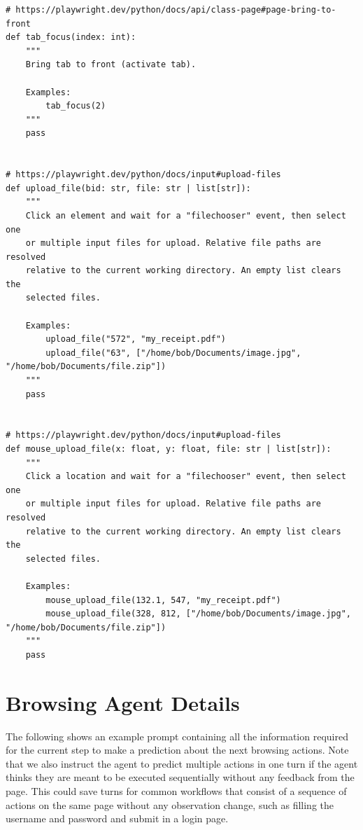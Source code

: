 \begin{verbatim}
# https://playwright.dev/python/docs/api/class-page#page-bring-to-front
def tab_focus(index: int):
    """
    Bring tab to front (activate tab).

    Examples:
        tab_focus(2)
    """
    pass


# https://playwright.dev/python/docs/input#upload-files
def upload_file(bid: str, file: str | list[str]):
    """
    Click an element and wait for a "filechooser" event, then select one
    or multiple input files for upload. Relative file paths are resolved
    relative to the current working directory. An empty list clears the
    selected files.

    Examples:
        upload_file("572", "my_receipt.pdf")
        upload_file("63", ["/home/bob/Documents/image.jpg", "/home/bob/Documents/file.zip"])
    """
    pass


# https://playwright.dev/python/docs/input#upload-files
def mouse_upload_file(x: float, y: float, file: str | list[str]):
    """
    Click a location and wait for a "filechooser" event, then select one
    or multiple input files for upload. Relative file paths are resolved
    relative to the current working directory. An empty list clears the
    selected files.

    Examples:
        mouse_upload_file(132.1, 547, "my_receipt.pdf")
        mouse_upload_file(328, 812, ["/home/bob/Documents/image.jpg", "/home/bob/Documents/file.zip"])
    """
    pass

\end{verbatim}

\section{Browsing Agent Details}
\label{sec:browsing-agent-details}

The following shows an example prompt containing all the information required for the current step to make a prediction about the next browsing actions.
Note that we also instruct the agent to predict multiple actions in one turn if the agent thinks they are meant to be executed sequentially without any feedback from the page.
This could save turns for common workflows that consist of a sequence of actions on the same page without any observation change, such as filling the username and password and submit in a login page.


